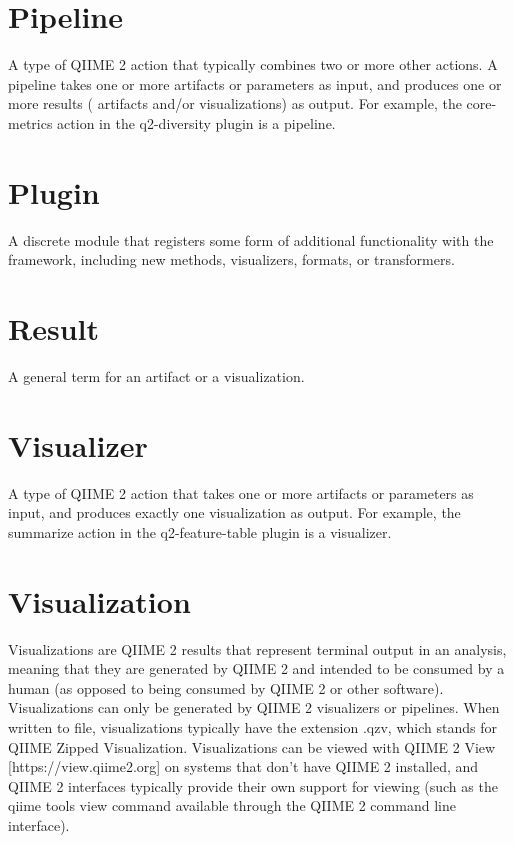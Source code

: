 \section*{Pipeline}
\noindent A type of QIIME 2 action that typically combines two or more other actions. A
pipeline takes one or more artifacts or parameters as input, and produces one or
more results ( artifacts and/or visualizations) as output. For example, the
core-metrics action in the q2-diversity plugin is a pipeline.

\section*{Plugin}
\noindent A discrete module that registers some form of additional functionality with the
framework, including new methods, visualizers, formats, or transformers.

\section*{Result}
\noindent A general term for an artifact or a visualization.

\section*{Visualizer}
\noindent A type of QIIME 2 action that takes one or more artifacts or parameters as
input, and produces exactly one visualization as output. For example, the
summarize action in the q2-feature-table plugin is a visualizer.

\section*{Visualization}
\noindent Visualizations are QIIME 2 results that represent terminal output in an
analysis, meaning that they are generated by QIIME 2 and intended to be consumed
by a human (as opposed to being consumed by QIIME 2 or other software).
Visualizations can only be generated by QIIME 2 visualizers or pipelines. When
written to file, visualizations typically have the extension .qzv, which stands
for QIIME Zipped Visualization. Visualizations can be viewed with QIIME 2 View
[https://view.qiime2.org] on systems that don’t have QIIME 2 installed, and
QIIME 2 interfaces typically provide their own support for viewing (such as the
qiime tools view command available through the QIIME 2 command line interface).